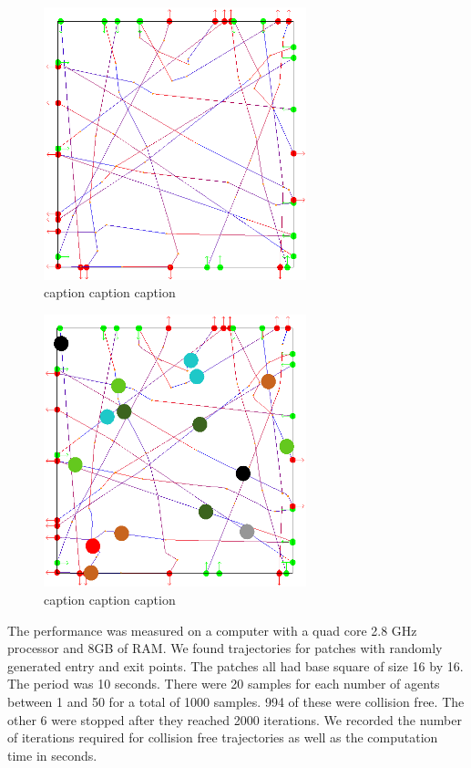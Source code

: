 \begin{figure}[H]
 \centering
 \includegraphics[width=3in]{images/steps-collisionFree.png}
 \caption{caption caption caption}
\end{figure}

\begin{figure}[H]
 \centering
 \includegraphics[width=3in]{images/steps-smoothed.png}
 \caption{caption caption caption}
\end{figure}


The performance was measured on a computer with a quad core 2.8 GHz processor and 8GB of RAM. We found trajectories for patches with randomly generated entry and exit points. The patches all had base square of size 16 by 16. The period was 10 seconds. There were 20 samples for each number of agents between 1 and 50 for a total of 1000 samples. 994 of these were collision free. The other 6 were stopped after they reached 2000 iterations. We recorded the number of iterations required for collision free trajectories as well as the computation time in seconds.

